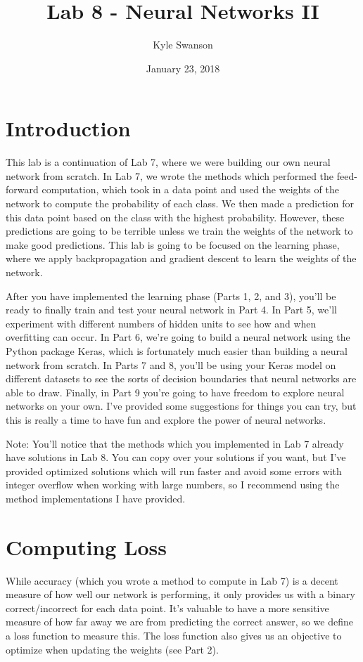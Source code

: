 \documentclass{article}
\title{Lab 8 - Neural Networks II}
\author{Kyle Swanson}
\date{January 23, 2018}
\begin{document}
\maketitle

\section{Introduction}

This lab is a continuation of Lab 7, where we were building our own neural network from scratch. In Lab 7, we wrote the methods which performed the feed-forward computation, which took in a data point and used the weights of the network to compute the probability of each class. We then made a prediction for this data point based on the class with the highest probability. However, these predictions are going to be terrible unless we train the weights of the network to make good predictions. This lab is going to be focused on the learning phase, where we apply backpropagation and gradient descent to learn the weights of the network.

After you have implemented the learning phase (Parts 1, 2, and 3), you'll be ready to finally train and test your neural network in Part 4. In Part 5, we'll experiment with different numbers of hidden units to see how and when overfitting can occur. In Part 6, we're going to build a neural network using the Python package Keras, which is fortunately much easier than building a neural network from scratch. In Parts 7 and 8, you'll be using your Keras model on different datasets to see the sorts of decision boundaries that neural networks are able to draw. Finally, in Part 9 you're going to have freedom to explore neural networks on your own. I've provided some suggestions for things you can try, but this is really a time to have fun and explore the power of neural networks.

Note: You'll notice that the methods which you implemented in Lab 7 already have solutions in Lab 8. You can copy over your solutions if you want, but I've provided optimized solutions which will run faster and avoid some errors with integer overflow when working with large numbers, so I recommend using the method implementations I have provided.

\section{Computing Loss}

While accuracy (which you wrote a method to compute in Lab 7) is a decent measure of how well our network is performing, it only provides us with a binary correct/incorrect for each data point. It's valuable to have a more sensitive measure of how far away we are from predicting the correct answer, so we define a loss function to measure this. The loss function also gives us an objective to optimize when updating the weights (see Part 2).
\end{document}
